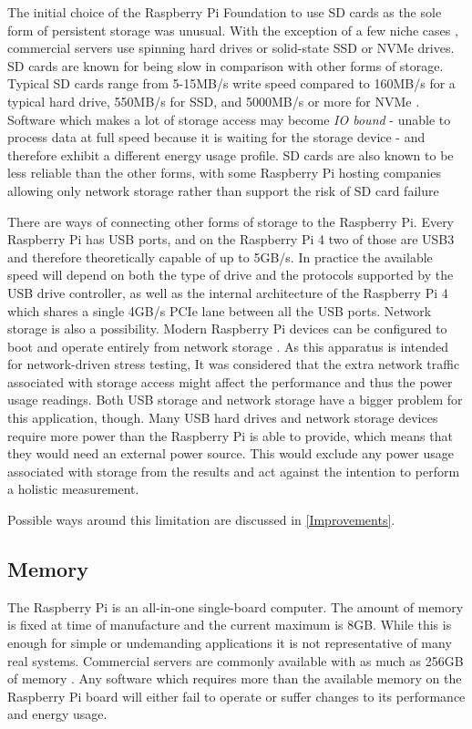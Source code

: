 The initial choice of the Raspberry Pi Foundation to use SD cards as the sole form of persistent storage was unusual. With the exception of a few niche cases \citep{RaspberryHosting}, commercial servers use spinning hard drives or solid-state SSD or NVMe drives. SD cards are known for being slow in comparison with other forms of storage. Typical SD cards range from 5-15MB/s write speed compared to 160MB/s for a typical hard drive, 550MB/s for SSD, and 5000MB/s or more for NVMe \citep{Tekie.com}. Software which makes a lot of storage access may become \emph{IO bound} - unable to process data at full speed because it is waiting for the storage device - and therefore exhibit a different energy usage profile. SD cards are also known to be less reliable than the other forms, with some Raspberry Pi hosting companies allowing only network storage rather than support the risk of SD card failure \citep{MythicBeasts}

There are ways of connecting other forms of storage to the Raspberry Pi. Every Raspberry Pi has USB ports, and on the Raspberry Pi 4 two of those are USB3 and therefore theoretically capable of up to 5GB/s. In practice the available speed will depend on both the type of drive and the protocols supported by the USB drive controller, as well as the internal architecture of the Raspberry Pi 4 which shares a single 4GB/s PCIe lane between all the USB ports. Network storage is also a possibility. Modern Raspberry Pi devices can be configured to boot and operate entirely from network storage \citep{RaspberryPiFoundation2023}. As this apparatus is intended for network-driven stress testing, It was considered that the extra network traffic associated with storage access might affect the performance and thus the power usage readings. Both USB storage and network storage have a bigger problem for this application, though. Many USB hard drives and network storage devices require more power than the Raspberry Pi is able to provide, which means that they would need an external power source. This would exclude any power usage associated with storage from the results and act against the intention to perform a holistic measurement.

Possible ways around this limitation are discussed in \autoref{Improvements}.

\subsection{Memory}

The Raspberry Pi is an all-in-one single-board computer. The amount of memory is fixed at time of manufacture and the current maximum is 8GB. While this is enough for simple or undemanding applications it is not representative of many real systems. Commercial servers are commonly available with as much as 256GB of memory \citep{FastHosts2023}. Any software which requires more than the available memory on the Raspberry Pi board will either fail to operate or suffer changes to its performance and energy usage.

